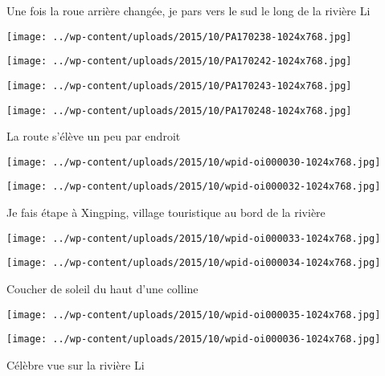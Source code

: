  \newline
 Une fois la roue arrière changée, je pars vers le sud le long de la rivière Li \newline
 \newline
\centerline{\texttt{[image: ../wp-content/uploads/2015/10/PA170238-1024x768.jpg]} } 
 \newline
 \newline
\centerline{\texttt{[image: ../wp-content/uploads/2015/10/PA170242-1024x768.jpg]} } 
 \newline
 \newline
\centerline{\texttt{[image: ../wp-content/uploads/2015/10/PA170243-1024x768.jpg]} } 
 \newline
 \newline
\centerline{\texttt{[image: ../wp-content/uploads/2015/10/PA170248-1024x768.jpg]} } 
 \newline
 La route s'élève un peu par endroit \newline
 \newline
\centerline{\texttt{[image: ../wp-content/uploads/2015/10/wpid-oi000030-1024x768.jpg]} } 
 \newline
 \newline
\centerline{\texttt{[image: ../wp-content/uploads/2015/10/wpid-oi000032-1024x768.jpg]} } 
 \newline
 Je fais étape à Xingping, village touristique au bord de la rivière \newline
 \newline
\centerline{\texttt{[image: ../wp-content/uploads/2015/10/wpid-oi000033-1024x768.jpg]} } 
 \newline
 \newline
\centerline{\texttt{[image: ../wp-content/uploads/2015/10/wpid-oi000034-1024x768.jpg]} } 
 \newline
 Coucher de soleil du haut d'une colline \newline
 \newline
\centerline{\texttt{[image: ../wp-content/uploads/2015/10/wpid-oi000035-1024x768.jpg]} } 
 \newline
 \newline
\centerline{\texttt{[image: ../wp-content/uploads/2015/10/wpid-oi000036-1024x768.jpg]} } 
 \newline
 Célèbre vue sur la rivière Li \newline
 \newline
